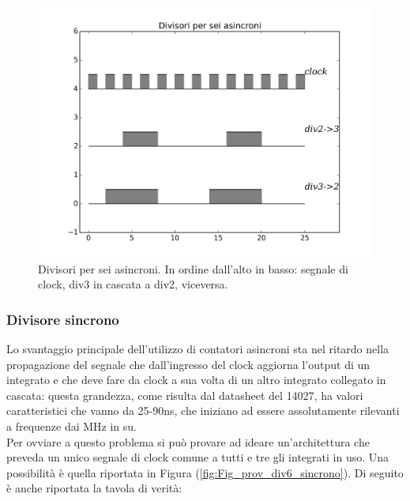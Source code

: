 \documentclass[journal, a4paper]{IEEEtran}
\begin{document}
\begin{figure}
\centering
\includegraphics[width=0.9\linewidth]{./div_sei_comparative_picture}
\caption{Divisori per sei asincroni. In ordine dall'alto in basso: segnale di clock, div3 in cascata a div2, viceversa.}
\label{fig:div_sei_comparative_picture}
\end{figure}


\subsubsection{Divisore sincrono}
Lo svantaggio principale dell'utilizzo di contatori asincroni sta nel ritardo nella propagazione del segnale che dall'ingresso del clock aggiorna l'output di un integrato e che deve fare da clock a sua volta di un altro integrato collegato in cascata: questa grandezza, come risulta dal datasheet del \textsc{14027}, ha valori caratteristici che vanno da 25-90ns, che iniziano ad essere assolutamente rilevanti a frequenze dai MHz in su.\\
Per ovviare a questo problema si può provare ad ideare un'architettura che preveda un unico segnale di clock comune a tutti e tre gli integrati in uso. Una possibilità è quella riportata in Figura (\ref{fig:Fig_prov_div6_sincrono}). Di seguito è anche riportata la tavola di verità:
\end{document}
